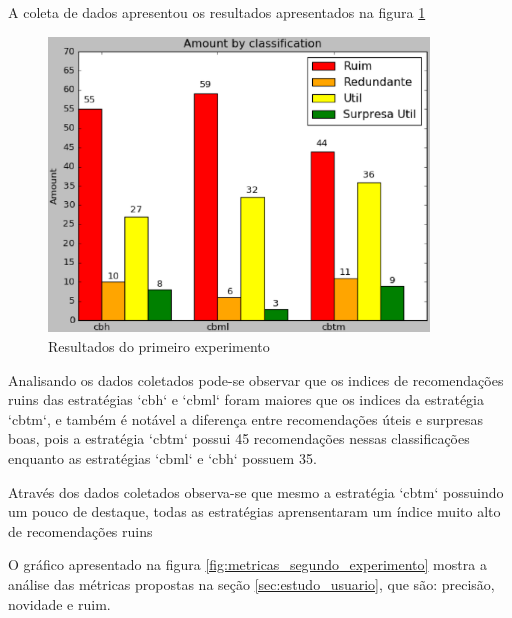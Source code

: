 A coleta de dados apresentou os resultados apresentados na figura
\ref{fig:primeiro_experimento}

\pagebreak

\begin{figure}[h]
  \centering
  \includegraphics[width=0.9\textwidth]{figuras/primeiro_experimento.eps}
  \caption{Resultados do primeiro experimento}
  \label{fig:primeiro_experimento}
\end{figure}

Analisando os dados coletados pode-se observar que os indices de recomendações
ruins das estratégias `cbh` e `cbml` foram maiores que os indices da estratégia
`cbtm`, e também é notável a diferença entre recomendações úteis e surpresas
boas, pois a estratégia `cbtm` possui 45 recomendações nessas classificações
enquanto as estratégias `cbml` e `cbh` possuem 35.

Através dos dados coletados observa-se que mesmo a estratégia `cbtm` possuindo
um pouco de destaque, todas as estratégias aprensentaram um índice muito alto
de recomendações ruins

O gráfico apresentado na figura \ref{fig:metricas_segundo_experimento} mostra
a análise das métricas propostas na seção \ref{sec:estudo_usuario}, que são:
precisão, novidade e ruim.

\pagebreak

